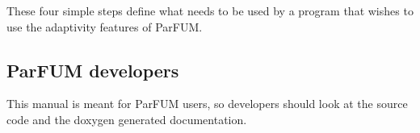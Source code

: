 

These four simple steps define what needs to be used by a program that wishes
to use the adaptivity features of ParFUM.

\subsection{ParFUM developers}
This manual is meant for ParFUM users, so developers should look at the source code
and the doxygen generated documentation.

